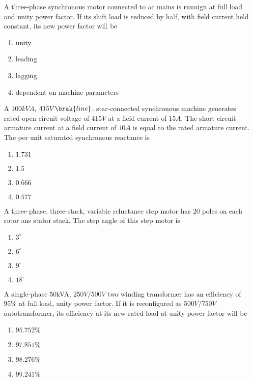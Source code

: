 \item A three-phase synchronous motor connected to ac mains is runnign at full load and unity power factor. If its shift load is reduced by half, with field current held constant, its new power factor will be 
\begin{enumerate}
    \item unity
    \item leading
    \item lagging
    \item dependent on machine parameters
\end{enumerate}    
\item A $100kVA$, $415V\brak{line}$, star-connected synchronous machine generates rated open circuit voltage of $415V$ at a field current of $15A$. The short circuit armature current at a field current of $10A$ is equal to the rated armature current. The per unit saturated synchronous reactance is 
\begin{multicols}{2}
\begin{enumerate}
    \item $1.731$
    \item $1.5$
    \item $0.666$
    \item $0.577$
\end{enumerate}    
\end{multicols}
\item A three-phase, three-stack, variable reluctance step motor has 20 poles on each rotor ans stator stack. The step angle of this step motor is
\begin{multicols}{2}
\begin{enumerate}
    \item $3^\circ$
    \item $6^\circ$
    \item $9^\circ$
    \item $18^\circ$
\end{enumerate}    
\end{multicols}
\item A single-phase $50$kVA, $250V/500V$ two winding transformer has an efficiency of $95\%$ at full load, unity power factor. If it is reconfigured as $500V/750V$ autotransformer, its efficiency at its new rated load at unity power factor will be 
\begin{multicols}{2}
\begin{enumerate}
  \item $95.752\%$
    \item $97.851\%$
    \item $98.276\%$
    \item $99.241\%$
\end{enumerate}    
\end{multicols}
